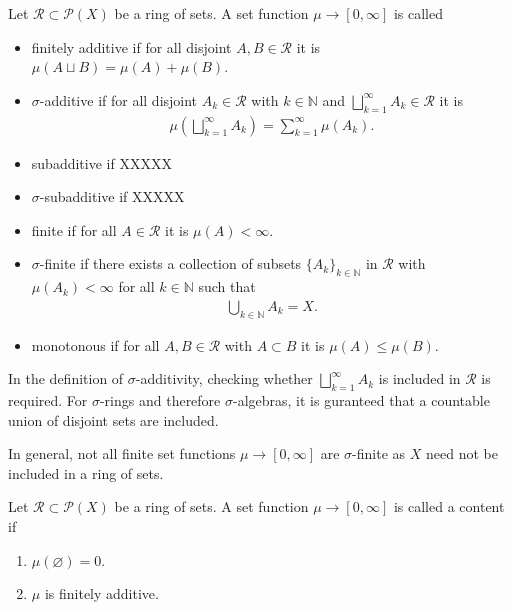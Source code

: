 \begin{definition}
    Let \(\mathcal{R} \subset \mathcal{P}(X)\) be a ring of sets. A set function \(\mu \rightarrow [0, \infty]\) is called
    \begin{itemize}
        \item finitely additive if for all disjoint \(A, B \in \mathcal{R}\) it is \(\mu (A \sqcup B) = \mu(A) + \mu(B)\).
        \item \(\sigma\)-additive if for all disjoint \(A_k \in \mathcal{R}\) with \(k \in \mathbb{N}\) and  \(\bigsqcup_{k=1}^\infty A_k \in \mathcal{R}\) it is
        \begin{align}
            \mu \left( \bigsqcup_{k=1}^\infty A_k \right) = \sum_{k=1}^\infty \mu(A_k) \text{.}
        \end{align}
        \item subadditive if XXXXX
        \item \(\sigma\)-subadditive if XXXXX
        \item finite if for all \(A \in \mathcal{R}\) it is \(\mu(A) < \infty\).
        \item \(\sigma\)-finite if there exists a collection of subsets \(\{A_k\}_{k \in \mathbb{N}}\) in \(\mathcal{R}\) with \(\mu(A_k) < \infty\) for all \(k \in \mathbb{N}\) such that
        \begin{align}
            \bigcup_{k \in \mathbb{N}} A_k = X \text{.}
        \end{align}
        \item monotonous if for all \(A, B \in \mathcal{R}\) with \(A \subset B\) it is \(\mu(A) \leq \mu(B)\).
    \end{itemize}
\end{definition}
%
\begin{remark}
    In the definition of \(\sigma\)-additivity, checking whether \( \bigsqcup_{k=1}^\infty A_k\) is included in \(\mathcal{R}\) is required. For \(\sigma\)-rings and therefore \(\sigma\)-algebras, it is guranteed that a countable union of disjoint sets are included.

    In general, not all finite set functions \(\mu \rightarrow [0, \infty]\) are \(\sigma\)-finite as \(X\) need not be included in a ring of sets. 
\end{remark}
\begin{definition}[Content]
    Let \(\mathcal{R} \subset \mathcal{P}(X)\) be a ring of sets. A set function \(\mu \rightarrow [0, \infty]\) is called a content if
    \begin{enumerate}
        \item \(\mu(\varnothing) = 0\).
        \item \(\mu\) is finitely additive.
    \end{enumerate}
\end{definition}
